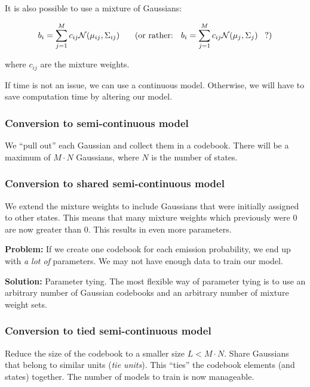 \documentclass[11pt]{article}
\begin{document}
It is also possible to use a mixture of Gaussians:

\[
    b_i = \sum\limits_{j=1}^M c_{ij} \mathcal{N}(\mu_{ij}, \Sigma_{ij}) \mbox{\hspace{15pt} (or rather: \hspace{5pt}} b_i = \sum\limits_{j=1}^M c_{ij} \mathcal{N}(\mu_{j}, \Sigma_{j}) \mbox{\hspace{5pt} ?)}
\]

where $c_{ij}$ are the mixture weights.

If time is not an issue, we can use a continuous model. Otherwise, we will have to save computation time by altering our model.

\subsubsection{Conversion to semi-continuous model}

We ``pull out'' each Gaussian and collect them in a codebook. There will be a maximum of $M \cdot N$ Gaussians, where $N$ is the number of states.

\subsubsection{Conversion to shared semi-continuous model}

We extend the mixture weights to include Gaussians that were initially assigned to other states. This means that many mixture weights which previously were $0$ are now greater than $0$. This results in even more parameters.

\vspace{15pt}

\textbf{Problem:} If we create one codebook for each emission probability, we end up with \textit{a lot of} parameters. We may not have enough data to train our model.

\vspace{5pt}

\textbf{Solution:} Parameter tying. The most flexible way of parameter tying is to use an arbitrary number of Gaussian codebooks and an arbitrary number of mixture weight sets.

\subsubsection{Conversion to tied semi-continuous model}

Reduce the size of the codebook to a smaller size $L < M \cdot N$. Share Gaussians that belong to similar units (\textit{tie units}). This ``ties'' the codebook elements (and states) together. The number of models to train is now manageable.
\end{document}

